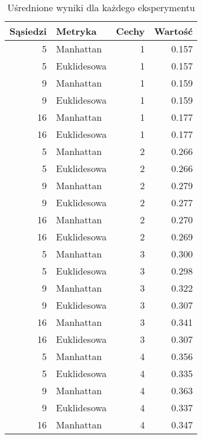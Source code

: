 \documentclass[runningheads]{llncs}
\begin{document}
\begin{table}[H]
  \caption{Uśrednione wyniki dla każdego eksperymentu}
  \begin{minipage}{0.5\textwidth}
    \begin{tabular}{|r|l|r|r|}
    \hline
    \multicolumn{1}{|l|}{\textbf{Sąsiedzi}} & \textbf{Metryka} & \multicolumn{1}{l|}{\textbf{Cechy}} & \multicolumn{1}{l|}{\textbf{Wartość}} \bigstrut\\
    \hline
    5 & Manhattan & 1 & 0.157 \bigstrut\\
    \hline
    5 & Euklidesowa & 1 & 0.157 \bigstrut\\
    \hline
    9 & Manhattan & 1 & 0.159 \bigstrut\\
    \hline
    9 & Euklidesowa & 1 & 0.159 \bigstrut\\
    \hline
    16 & Manhattan & 1 & 0.177 \bigstrut\\
    \hline
    16 & Euklidesowa & 1 & 0.177 \bigstrut\\
    \hline
    5 & Manhattan & 2 & 0.266 \bigstrut\\
    \hline
    5 & Euklidesowa & 2 & 0.266 \bigstrut\\
    \hline
    9 & Manhattan & 2 & 0.279 \bigstrut\\
    \hline
    9 & Euklidesowa & 2 & 0.277 \bigstrut\\
    \hline
    16 & Manhattan & 2 & 0.270 \bigstrut\\
    \hline
    16 & Euklidesowa & 2 & 0.269 \bigstrut\\
    \hline
    5 & Manhattan & 3 & 0.300 \bigstrut\\
    \hline
    5 & Euklidesowa & 3 & 0.298 \bigstrut\\
    \hline
    9 & Manhattan & 3 & 0.322 \bigstrut\\
    \hline
    9 & Euklidesowa & 3 & 0.307 \bigstrut\\
    \hline
    16 & Manhattan & 3 & 0.341 \bigstrut\\
    \hline
    16 & Euklidesowa & 3 & 0.307 \bigstrut\\
    \hline
    5 & Manhattan & 4 & 0.356 \bigstrut\\
    \hline
    5 & Euklidesowa & 4 & 0.335 \bigstrut\\
    \hline
    9 & Manhattan & 4 & 0.363 \bigstrut\\
    \hline
    9 & Euklidesowa & 4 & 0.337 \bigstrut\\
    \hline
    16 & Manhattan & 4 & 0.347 \bigstrut\\

\end{tabular}
\end{minipage}
\end{table}
\end{document}
